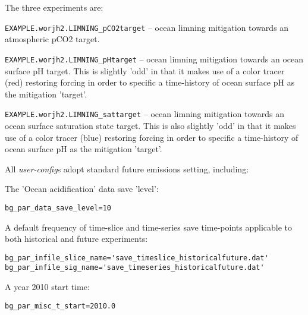 \documentclass[10pt,twoside]{article}
\begin{document}
The three experiments are:

        \begin{compactenum}
        
                \item \texttt{EXAMPLE.worjh2.LIMNING\_pCO2target} -- ocean limning mitigation towards an atmospheric pCO2 target.
                
                \item \texttt{EXAMPLE.worjh2.LIMNING\_pHtarget} -- ocean limning mitigation towards an ocean surface pH target. This is slightly 'odd' in that it makes use of a color tracer (red) restoring forcing in order to specific a time-history of ocean surface pH as the mitigation 'target'.
                
                \item \texttt{EXAMPLE.worjh2.LIMNING\_sattarget} -- ocean limning mitigation towards an ocean surface saturation state target. This is also slightly 'odd' in that it makes use of a color tracer (blue) restoring forcing in order to specific a time-history of ocean surface pH as the mitigation 'target'.
                
        \end{compactenum}

All \textit{user-config}s adopt standard future emissions setting, including:
\begin{compactitem}
                \item The 'Ocean acidification' data save 'level':
\vspace{-5pt}\begin{verbatim}
bg_par_data_save_level=10
                \end{verbatim}\vspace{-5pt}
                \item A default frequency of time-slice and time-series save time-points applicable to both historical and future experiments:
\vspace{-5pt}\begin{verbatim}
bg_par_infile_slice_name='save_timeslice_historicalfuture.dat'
bg_par_infile_sig_name='save_timeseries_historicalfuture.dat'
                \end{verbatim}\vspace{-5pt}
                \item A year 2010 start time:
\vspace{-5pt}\begin{verbatim}
bg_par_misc_t_start=2010.0
                \end{verbatim}\vspace{-5pt}
        \end{compactitem}
\end{document}
